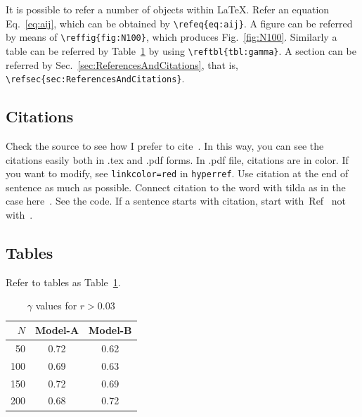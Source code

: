 \documentclass[pre,twocolumn,showkeys,longbibliography]{revtex4-1}
\newcommand{\reffig}[1]{Fig.~\ref{#1}}
\newcommand{\refeq}[1]{Eq.~\ref{#1}}
\newcommand{\reftbl}[1]{Table~\ref{#1}}
\newcommand{\refsec}[1]{Sec.~\ref{#1}}
\newcommand{\refcite}[1]{Ref~\cite{#1}}
\newcommand{\hbCode}[1]{\texttt{#1}}
\theoremstyle{plain}%
\theoremstyle{definition}
\theoremstyle{remark}
\begin{document}
It is possible to refer a number of objects within \LaTeX.
Refer an equation \refeq{eq:aij}, which can be obtained by \verb!\refeq{eq:aij}!. 
A figure can be referred by means of \verb!\reffig{fig:N100}!, which produces \reffig{fig:N100}.
Similarly a table can be referred by \reftbl{tbl:gamma} by using \verb!\reftbl{tbl:gamma}!.
A section can be referred by \refsec{sec:ReferencesAndCitations}, 
that is, 
\verb!\refsec{sec:ReferencesAndCitations}!.



\subsection{Citations}

Check the source to see how I prefer to cite~\cite{%
	duda2012pattern,
	mackay2003information,
	theodoridis2010patternMatlab}.
In this way, you can see the citations easily both in .tex and .pdf forms.
In .pdf file, citations are in color.
If you want to modify,
see 
\hbCode{linkcolor=red}
in 
\hbCode{hyperref}.
Use citation at  the end of sentence as much as possible.
Connect citation to the word with tilda as in the case here~\cite{%
	AAa2017bb}.
See the code.
If a sentence starts with citation,
start with~\refcite{%
	AAa2017bb}  
not with~\cite{%
	AAa2017bb}.









\subsection{Tables}


Refer to tables as \reftbl{tbl:gamma}.


\begin{table}[th]
	\caption{$\gamma$ values for $r > 0.03$}
	\begin{center}
	\begin{tabular}{|r|cc|}
		\hline
		$N$
		&Model-A %
		&Model-B\\
		\hline
		50
		&0.72
		&0.62\\
		100
		&0.69
		&0.63\\
		150
		&0.72
		&0.69\\
		200
		&0.68
		&0.72\\
		\hline
	\end{tabular}
	\end{center}
	\label{tbl:gamma}
\end{table}%
\end{document}
